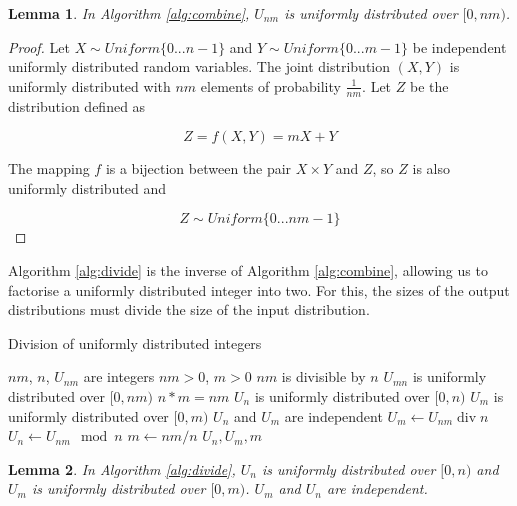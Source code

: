 \documentclass[12pt]{article}
\newtheorem{lemma}{Lemma}
\begin{document}
\begin{lemma}
In Algorithm \ref{alg:combine}, $U_{nm}$ is uniformly distributed over $[0,nm)$.
\label{lem:combine}
\end{lemma}

\begin{proof}
Let $X \sim Uniform \{0 ... n-1\}$ and $Y \sim Uniform\{0 ... m-1\}$ be independent uniformly distributed random variables. The joint distribution $(X,Y)$ is uniformly distributed with $nm$ elements of probability $\frac{1}{nm}$. Let $Z$ be the distribution defined as

\begin{equation}
Z = f(X,Y) = mX+Y
\end{equation}

The mapping $f$ is a bijection between the pair $X \times Y$ and $Z$, so $Z$ is also uniformly distributed and 

\begin{equation}
Z \sim Uniform \{0 ... nm-1\}
\end{equation}
\end{proof}

Algorithm \ref{alg:divide} is the inverse of Algorithm \ref{alg:combine}, allowing us to factorise a uniformly distributed integer into two. For this, the sizes of the output distributions must divide the size of the input distribution.

\begin{algorithm}
\caption{Division of uniformly distributed integers}
\label{alg:divide}
\begin{algorithmic}[1]
    \Require $nm$, $n$, $U_{nm}$ are integers
    \Require $nm>0$, $m>0$
    \Require $nm$ is divisible by $n$
    \Require $U_{mn}$ is uniformly distributed over $[0,nm)$
    \Ensure $n * m = nm$
    \Ensure $U_{n}$ is uniformly distributed over $[0,n)$
    \Ensure $U_{m}$ is uniformly distributed over $[0,m)$
    \Ensure $U_n$ and $U_m$ are independent
  \State $U_m \gets U_{nm} \operatorname{div} n$
  \State $U_{n} \gets U_{nm} \mod n$
  \State $m \gets nm / n$
  \State \Return $U_n, U_m, m$
\EndProcedure
\end{algorithmic}
\end{algorithm}

\begin{lemma}
In Algorithm \ref{alg:divide}, $U_n$ is uniformly distributed over $[0,n)$ and $U_m$ is uniformly distributed over $[0,m)$. $U_m$ and $U_n$ are independent.

\label{lem:divide}
\end{lemma}
\end{document}

